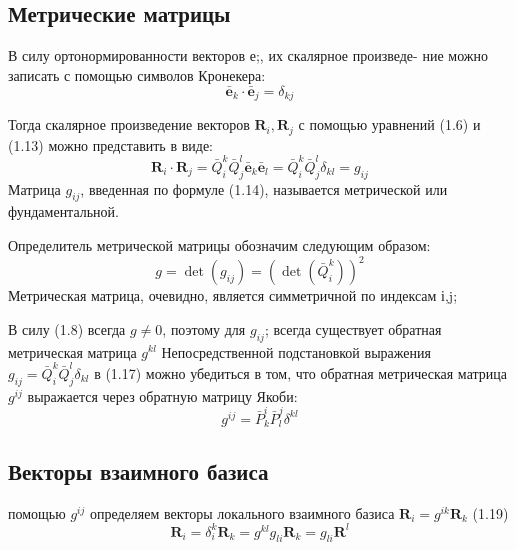 \subsection{Метрические матрицы}
В силу ортонормированности векторов е;, их скалярное произведе- ние можно записать с помощью символов Кронекера:
\begin{equation}
    \bar{\textbf{e}}_k \cdot \bar{\textbf{e}}_j = \delta_{kj}
\end{equation}\par
Тогда скалярное произведение векторов $\textbf{R}_i, \textbf{R}_j$ с помощью уравнений (1.6) и (1.13) можно представить в виде:
\begin{equation}
    \textbf{R}_i\cdot \textbf{R}_j = 
    \bar{Q}^k_i \bar{Q}^l_j \bar{\textbf{e}}_k \bar{\textbf{e}}_l =
    \bar{Q}^k_i \bar{Q}^l_j \delta_{kl} =
    g_{ij}
\end{equation}
 Матрица $g_{ij}$, введенная по формуле (1.14), называется
метрической или фундаментальной.

Определитель метрической матрицы обозначим следующим образом:
\begin{equation}
    g = \det(g_{ij}) = (\det(\bar{Q}^k_i))^2
\end{equation}
Метрическая матрица, очевидно, является симметричной по индексам і,j;

В силу (1.8) всегда $g \ne 0$, поэтому для $g_{ij}$; всегда существует обратная метрическая матрица $g^{kl}$
Непосредственной подстановкой выражения $g_{ij} = \bar{Q}^k_i \bar{Q}^l_j \delta_{kl}$ в (1.17) можно убедиться в том, что обратная метрическая матрица $g^{ij}$ выражается через обратную матрицу Якоби:
\begin{equation}
    g^{ij} = \bar{P}^i_k \bar{P}^j_l \delta^{kl}
\end{equation}
\subsection{Векторы взаимного базиса}
 помощью $g^{ij}$ определяем векторы локального взаимного базиса $\textbf{R}_i =g^{ik}\textbf{R}_k$
(1.19)
\begin{equation}
    \textbf{R}_i = \delta^k_i\textbf{R}_k =
    g^{kl}g_{li}\textbf{R}_k = g_{li}\textbf{R}^l
\end{equation}